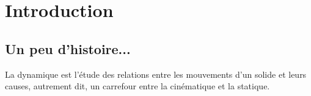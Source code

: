 \documentclass[11pt]{article}
\begin{document}
\UPSTIbuildPage

\renewcommand{\baselinestretch}{0.1}
\setcounter{tocdepth}{2}
{\small{\tableofcontents}}

\renewcommand{\baselinestretch}{1}\normalsize

\newpage
\section{Introduction}

\subsection{Un peu d'histoire...}

La dynamique est l'étude des relations entre les mouvements d'un solide et leurs causes, autrement dit, un carrefour entre la cinématique et la statique.
\end{document}

